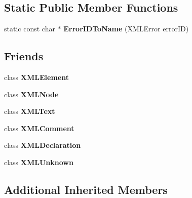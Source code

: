 \subsection*{Static Public Member Functions}
\begin{DoxyCompactItemize}
\item 
\mbox{\label{classtinyxml2_1_1_x_m_l_document_a639f7c295c38dc5a4aafeb2fff93da03}} 
static const char $\ast$ {\bfseries Error\+I\+D\+To\+Name} (X\+M\+L\+Error error\+ID)
\end{DoxyCompactItemize}
\subsection*{Friends}
\begin{DoxyCompactItemize}
\item 
\mbox{\label{classtinyxml2_1_1_x_m_l_document_ac2fba9b6e452829dd892f7392c24e0eb}} 
class {\bfseries X\+M\+L\+Element}
\item 
\mbox{\label{classtinyxml2_1_1_x_m_l_document_a8233f9dc4d61d90e93be2a3647c6d957}} 
class {\bfseries X\+M\+L\+Node}
\item 
\mbox{\label{classtinyxml2_1_1_x_m_l_document_ae50b59416e98bbe7e4bc87df40092109}} 
class {\bfseries X\+M\+L\+Text}
\item 
\mbox{\label{classtinyxml2_1_1_x_m_l_document_acee9e261162d4236fb2c30312c54cd4c}} 
class {\bfseries X\+M\+L\+Comment}
\item 
\mbox{\label{classtinyxml2_1_1_x_m_l_document_a93d2c2c2db3973083b7d6e7f6f358160}} 
class {\bfseries X\+M\+L\+Declaration}
\item 
\mbox{\label{classtinyxml2_1_1_x_m_l_document_a6946948274f7a02f5e69b5dbeaea9b35}} 
class {\bfseries X\+M\+L\+Unknown}
\end{DoxyCompactItemize}
\subsection*{Additional Inherited Members}


